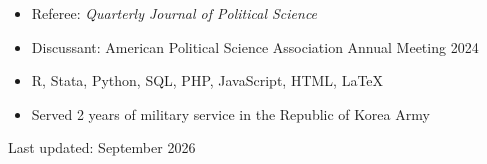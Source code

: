 \documentclass[11pt, Letter]{article}
\begin{document}
\vspace{3mm}

\begin{itemize}[leftmargin=47pt,itemindent=-21pt]
    \item[] Referee: \textit{Quarterly Journal of Political Science}
    \item[] Discussant: American Political Science Association Annual Meeting 2024
\end{itemize}

\vspace{3mm}


\begin{itemize}[leftmargin=47pt,itemindent=-21pt]
    \item[] R, Stata, Python, SQL, PHP, JavaScript, HTML, \LaTeX
    \item[] Served 2 years of military service in the Republic of Korea Army
\end{itemize}


\vspace{6mm}
\centering\small
Last updated: September 2026
\end{document}
